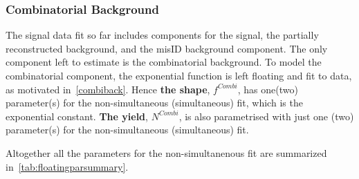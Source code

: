 \subsubsection{Combinatorial Background}
The signal data fit so far includes components for the signal, the partially reconstructed background, and the misID background component. The only component left to estimate is the combinatorial background. To model the combinatorial component, the exponential function is left floating and fit to data, as motivated in~\autoref{combiback}. Hence \textbf{the shape}, $f^{Combi}$, has one(two) parameter(s) for the non-simultaneous (simultaneous) fit, which is the exponential constant. \textbf{The yield}, $N^{Combi}$, is also parametrised with just one (two) parameter(s) for the non-simultaneous (simultaneous) fit.

Altogether all the parameters for the non-simultanenous fit are summarized in~\autoref{tab:floatingparsummary}.
%
%
%
%
